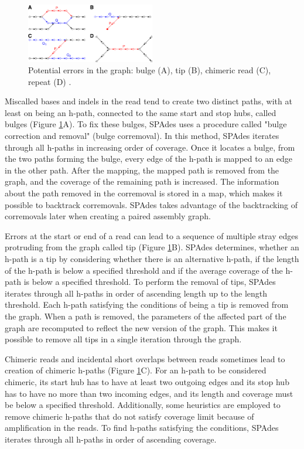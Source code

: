\begin{figure}[h]
  \begin{center}
     \includegraphics[width=0.5\textwidth]{images/errors.png}
     \caption{Potential errors in the graph: bulge (A), tip (B), chimeric read (C), repeat (D) \cite{bankevich2012spades}.}\label{fig:errors}
  \end{center}
\end{figure} 

Miscalled bases and indels in the read tend to create two distinct paths, with at least on being an h-path, connected to the same start and stop hubs, called bulges (Figure \ref{fig:errors}A). To fix these bulges, SPAdes uses a procedure called "bulge correction and removal" (bulge corremoval). In this method, SPAdes iterates through all h-paths in increasing order of coverage. Once it locates a bulge, from the two paths forming the bulge, every edge of the h-path is mapped to an edge in the other path. After the mapping, the mapped path is removed from the graph, and the coverage of the remaining path is increased. The information about the path removed in the corremoval is stored in a map, which makes it possible to backtrack corremovals. SPAdes takes advantage of the backtracking of corremovals later when creating a paired assembly graph.

Errors at the start or end of a read can lead to a sequence of multiple stray edges protruding from the graph called tip (Figure \ref{fig:errors}B). SPAdes determines, whether an h-path is a tip by considering whether there is an alternative h-path, if the length of the h-path is below a specified threshold and if the average coverage of the h-path is below a specified threshold. To perform the removal of tips, SPAdes iterates through all h-paths in order of ascending length up to the length threshold. Each h-path satisfying the conditions of being a tip is removed from the graph. When a path is removed, the parameters of the affected part of the graph are recomputed to reflect the new version of the graph. This makes it possible to remove all tips in a single iteration through the graph.

Chimeric reads and incidental short overlaps between reads sometimes lead to creation of chimeric h-paths (Figure \ref{fig:errors}C). For an h-path to be considered chimeric, its start hub has to have at least two outgoing edges and its stop hub has to have no more than two incoming edges, and its length and coverage must be below a specified threshold. Additionally, some heuristics are employed to remove chimeric h-paths that do not satisfy coverage limit because of amplification in the reads. To find h-paths satisfying the conditions, SPAdes iterates through all h-paths in order of ascending coverage.

